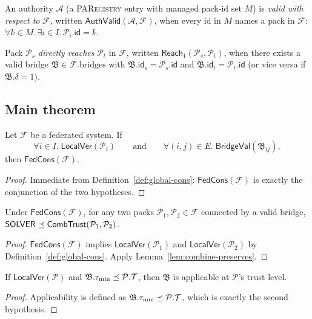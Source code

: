 \documentclass[11pt]{article}
\newcommand{\Pack}{\mathcal{P}}
\newcommand{\FedSys}{\mathcal{F}}
\newcommand{\PAuth}{\mathcal{A}}
\newcommand{\Brid}{\mathfrak{B}}
\newcommand{\PackId}{\mathsf{id}}
\newcommand{\LocalVer}{\mathsf{LocalVer}}
\newcommand{\BridgeVal}{\ensuremath{\mathsf{BridgeVal}}}
\newcommand{\FedCons}{\ensuremath{\mathsf{FedCons}}}
\newcommand{\AuthValid}{\ensuremath{\mathsf{AuthValid}}}
\newcommand{\CombTrust}{\ensuremath{\mathsf{CombTrust}}}
\newcommand{\Reach}{\ensuremath{\mathsf{Reach}}}
\newcommand{\PAR}{\textsc{PARegistry}}
\begin{document}
\begin{definition}
\label{def:auth-valid}
An authority $\PAuth$ (a \PAR{} entry with managed pack-id set $M$)
is \emph{valid with respect to} $\FedSys$, written
$\AuthValid(\PAuth, \FedSys)$, when every id in $M$ names a pack in
$\FedSys$: $\forall k \in M.\, \exists i \in I.\, \Pack_i.\PackId = k$.
\end{definition}

\begin{definition}[Reachability]
\label{def:reach}
Pack $\Pack_s$ \emph{directly reaches} $\Pack_t$ in $\FedSys$,
written $\Reach_1(\Pack_s, \Pack_t)$, when there exists a valid bridge
$\Brid \in \FedSys.\text{bridges}$ with $\Brid.\PackId_s = \Pack_s.\PackId$
and $\Brid.\PackId_t = \Pack_t.\PackId$ (or vice versa if
$\Brid.\delta = 1$).
\end{definition}

\subsection{Main theorem}

\begin{theorem}
\label{thm:fed-cons}
Let $\FedSys$ be a federated system.  If
\[
  \forall i \in I.\; \LocalVer(\Pack_i)
  \qquad\text{and}\qquad
  \forall (i,j) \in E.\; \BridgeVal(\Brid_{ij}),
\]
then $\FedCons(\FedSys)$.
\end{theorem}
\begin{proof}
Immediate from Definition~\ref{def:global-cons}: $\FedCons(\FedSys)$
is exactly the conjunction of the two hypotheses.
\end{proof}

\begin{corollary}
\label{cor:evidence-sound}
Under $\FedCons(\FedSys)$, for any two packs $\Pack_1, \Pack_2 \in
\FedSys$ connected by a valid bridge,
$\Tsolver \tleq \CombTrust(\Pack_1, \Pack_2)$.
\end{corollary}
\begin{proof}
$\FedCons(\FedSys)$ implies $\LocalVer(\Pack_1)$ and
$\LocalVer(\Pack_2)$ by Definition~\ref{def:global-cons}.
Apply Lemma~\ref{lem:combine-preserves}.
\end{proof}

\begin{lemma}
\label{lem:trust-dom}
If $\LocalVer(\Pack)$ and $\Brid.\tau_{\min} \tleq \Pack.\trust$,
then $\Brid$ is applicable at $\Pack$'s trust level.
\end{lemma}
\begin{proof}
Applicability is defined as $\Brid.\tau_{\min} \tleq \Pack.\trust$,
which is exactly the second hypothesis.
\end{proof}
\end{document}
